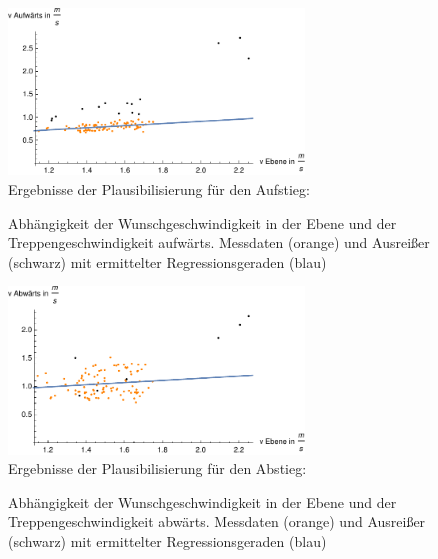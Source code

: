 \begin{figure}[htpb]
\centering
\includegraphics[width=0.7\textwidth]{abbildungen/regression/2012_2017_verbund/ohneausreisser/auf-ebene.pdf}
\justify \ \\
Ergebnisse der Plausibilisierung für den Aufstieg:

\caption{Abhängigkeit der Wunschgeschwindigkeit in der Ebene und der Treppengeschwindigkeit aufwärts. Messdaten (orange) und Ausreißer (schwarz) mit ermittelter Regressionsgeraden (blau)}
\label{fig:2012_und_2017_OA_auf_ebene}
\end{figure}

\begin{figure}[htpb]
\centering
\includegraphics[width=0.7\textwidth]{abbildungen/regression/2012_2017_verbund/ohneausreisser/ab-ebene.pdf}
\justify \ \\
Ergebnisse der Plausibilisierung für den Abstieg:

\caption{Abhängigkeit der Wunschgeschwindigkeit in der Ebene und der Treppengeschwindigkeit abwärts. Messdaten (orange) und Ausreißer (schwarz) mit ermittelter Regressionsgeraden (blau)}
\label{fig:2012_und_2017_OA_ab_ebene}
\end{figure}













